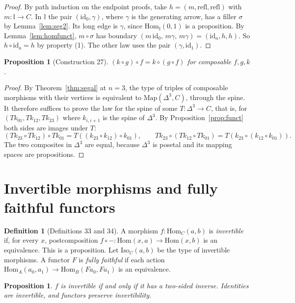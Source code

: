 \documentclass[11pt]{amsart}
\numberwithin{equation}{section}
\newtheorem{proposition}[theorem]{Proposition}
\theoremstyle{definition}
\newtheorem{definition}[theorem]{Definition}
\theoremstyle{remark}
\newcommand{\Map}{\mathrm{Map}}
\newcommand{\Hom}{\mathrm{Hom}}
\newcommand{\Iso}{\mathrm{Iso}}
\newcommand{\id}{\mathrm{id}}
\newcommand{\II}{\mathbb{I}}
\begin{document}
\begin{proof}
By path induction on the endpoint proofs, take $h=(m,\mathrm{refl},
\mathrm{refl})$ with $m:\II\to C$. In $\II$ the pair $(\id_0,\gamma)$,
where $\gamma$ is the generating arrow, has a filler $\sigma$ by
Lemma~\ref{lem:seg2}. Its long edge is $\gamma$, since $\Hom_\II(0,1)$
is a proposition. By Lemma~\ref{lem:homfunct}, $m\circ\sigma$ has
boundary $(m\,\id_0,\,m\gamma,\,m\gamma)=(\id_a,h,h)$. So $h\circ\id_a=h$
by property (1). The other law uses the pair $(\gamma,\id_1)$.
\end{proof}

\begin{proposition}[Construction 27]
$(k\circ g)\circ f=k\circ(g\circ f)$ for composable $f,g,k$.
\end{proposition}

\begin{proof}
By Theorem~\ref{thm:segal} at $n=3$, the type of triples of composable
morphisms with their vertices is equivalent to $\Map(\Delta^3,C)$,
through the spine. It therefore suffices to prove the law for the
spine of some $T:\Delta^3\to C$, that is, for $(Tk_{01},Tk_{12},Tk_{23})$
where $k_{i,i+1}$ is the spine of $\Delta^3$. By
Proposition~\ref{prop:funct} both sides are images under $T$:
\[
(Tk_{23}\circ Tk_{12})\circ Tk_{01}=T((k_{23}\circ k_{12})\circ k_{01}),\qquad
Tk_{23}\circ(Tk_{12}\circ Tk_{01})=T(k_{23}\circ(k_{12}\circ k_{01})).
\]
The two composites in $\Delta^3$ are equal, because $\Delta^3$ is
posetal and its mapping spaces are propositions.
\end{proof}

\section{Invertible morphisms and fully faithful functors}\label{sec:ff}

\begin{definition}[Definitions 33 and 34]
A morphism $f:\Hom_C(a,b)$ is \emph{invertible} if, for every $x$,
postcomposition $f\circ-:\Hom(x,a)\to\Hom(x,b)$ is an equivalence. This
is a proposition. Let $\Iso_C(a,b)$ be the type of invertible
morphisms. A functor $F$ is \emph{fully faithful} if each action
$\Hom_A(a_0,a_1)\to\Hom_B(Fa_0,Fa_1)$ is an equivalence.
\end{definition}

\begin{proposition}\label{prop:inv}
$f$ is invertible if and only if it has a two-sided inverse.
Identities are invertible, and functors preserve invertibility.
\end{proposition}
\end{document}
